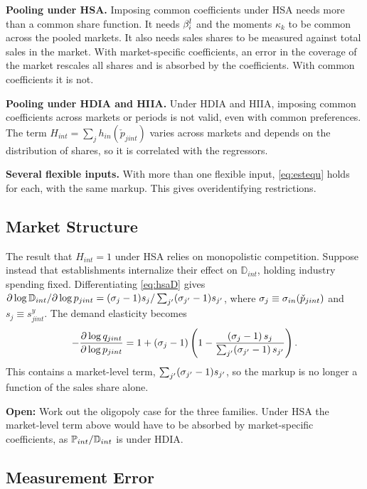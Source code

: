 \textbf{Pooling under HSA.}
Imposing common coefficients under HSA needs more than a common share function.
It needs $\b^l_i$ and the moments $\kappa_k$ to be common across the pooled markets.
It also needs sales shares to be measured against total sales in the market.
With market-specific coefficients, an error in the coverage of the market rescales all shares and is absorbed by the coefficients.
With common coefficients it is not.

\textbf{Pooling under HDIA and HIIA.}
Under HDIA and HIIA, imposing common coefficients across markets or periods is not valid, even with common preferences.
The term $H_{int} = \sum_{j} h_{in}(\check{p}_{jint})$ varies across markets and depends on the distribution of shares, so it is correlated with the regressors.

\textbf{Several flexible inputs.}
With more than one flexible input, \eqref{eq:estequ} holds for each, with the same markup.
This gives overidentifying restrictions.

\subsection{Market Structure}\label{sec:app-conduct}

The result that $H_{int} = 1$ under HSA relies on monopolistic competition.
Suppose instead that establishments internalize their effect on $\mathbb{D}_{int}$, holding industry spending fixed.
Differentiating \eqref{eq:hsaD} gives $\partial \log \mathbb{D}_{int}/\partial \log p_{jint} = (\s_j - 1)s_j/\sum_{j'} (\s_{j'} - 1)s_{j'}$, where $\s_j \equiv \s_{in}(\check{p}_{jint})$ and $s_j \equiv s^y_{jint}$.
The demand elasticity becomes
\begin{equation*}
	-\frac{\partial \log q_{jint}}{\partial \log p_{jint}} = 1 + \left(\s_j - 1\right)\left(1 - \frac{(\s_j - 1)\, s_j}{\sum_{j'} (\s_{j'} - 1)\, s_{j'}}\right).
\end{equation*}
This contains a market-level term, $\sum_{j'} (\s_{j'} - 1)s_{j'}$, so the markup is no longer a function of the sales share alone.

\textbf{Open:} Work out the oligopoly case for the three families.
Under HSA the market-level term above would have to be absorbed by market-specific coefficients, as $\P_{int}/\mathbb{D}_{int}$ is under HDIA.

\subsection{Measurement Error}\label{sec:app-me}

